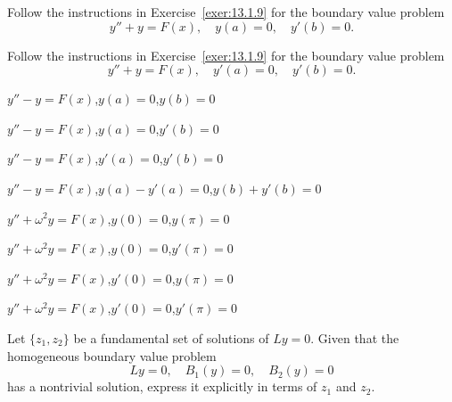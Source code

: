 \begin{exerciselist}
  \item\label{exer:13.1.10} Follow the instructions in Exercise~\ref{exer:13.1.9} for the boundary
        value problem
  \[
    y''+y=F(x),\quad y(a)=0,\quad y'(b)=0.
  \]

  \item\label{exer:13.1.11} Follow the instructions in Exercise~\ref{exer:13.1.9} for the boundary
        value problem
  \[
    y''+y=F(x),\quad y'(a)=0,\quad y'(b)=0.
  \]


  \item\label{exer:13.1.12} $y''-y=F(x)$,\quad $y(a)=0$,\quad $y(b)=0$

  \item\label{exer:13.1.13} $y''-y=F(x)$,\quad $y(a)=0$,\quad $y'(b)=0$

  \item\label{exer:13.1.14} $y''-y=F(x)$,\quad $y'(a)=0$,\quad $y'(b)=0$

  \item\label{exer:13.1.15} $y''-y=F(x)$,\quad $y(a)-y'(a)=0$,\quad $y(b)+y'(b)=0$


  \item\label{exer:13.1.16} $y''+\omega^{2}y=F(x)$,\quad $y(0)=0$,\quad $y(\pi)=0$

  \item\label{exer:13.1.17} $y''+\omega^{2}y=F(x)$,\quad $y(0)=0$,\quad $y'(\pi)=0$

  \item\label{exer:13.1.18} $y''+\omega^{2}y=F(x)$,\quad $y'(0)=0$,\quad $y(\pi)=0$

  \item\label{exer:13.1.19} $y''+\omega^{2}y=F(x)$,\quad $y'(0)=0$,\quad $y'(\pi)=0$

  \item\label{exer:13.1.20} Let $\{z_{1},z_{2}\}$ be a fundamental set of solutions of $Ly=0$. Given
        that the homogeneous boundary value problem
  \[
    Ly=0,\quad B_{1}(y)=0,\quad B_{2}(y)=0
  \]
  has a nontrivial solution, express it explicitly in terms of $z_{1}$ and $z_{2}$.


\end{exerciselist}
